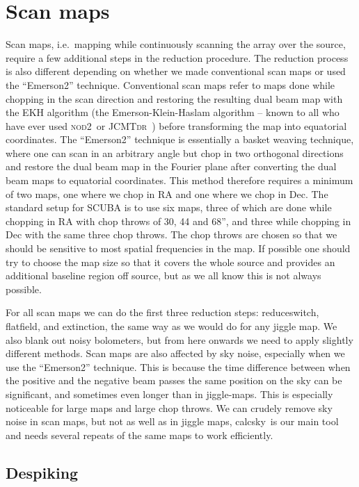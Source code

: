 \documentclass[twoside,11pt]{article}
\newcommand{\jcmtdr}{\xref{\textsc{JCMTdr}}{sun132}{}}
\newcommand{\nod}{\textsc{nod2}}
\newcommand{\task}[1]{\textsf{#1}}
\newcommand{\calcsky}{\xref{\task{calcsky}}{sun216}{CALCSKY}}
\newcommand{\resw}{\xref{\task{reduce\_switch}}{sun216}{REDUCE_SWITCH}}
\newcommand{\flatf}{\xref{\task{flatfield}}{sun216}{FLATFIELD}}
\newcommand{\ext}{\xref{\task{extinction}}{sun216}{EXTINCTION}}
\newcommand{\xref}[3]{#1}
\newcommand{\xlabel}[1]{}
\renewcommand{\_}{\texttt{\symbol{95}}}
\begin{document}
\section{\xlabel{Scanmaps}Scan maps}

Scan maps, i.e.\ mapping while continuously scanning the array over the
source, require a few additional steps in the reduction procedure. The
reduction process is also different depending on whether we made
conventional scan maps or used the ``Emerson2'' technique.
Conventional scan maps refer to maps done while chopping in the scan
direction and restoring the resulting dual beam map with the
EKH algorithm (the Emerson-Klein-Haslam algorithm -- known to all who
have ever used \nod\ or \jcmtdr\ \cite{jcmtdr}) before transforming the
map into equatorial coordinates.  The ``Emerson2'' technique is
essentially a basket weaving technique, where one can scan in an
arbitrary angle but chop in two orthogonal directions and restore the
dual beam map in the Fourier plane after converting the dual beam maps
to equatorial coordinates. This method therefore requires a minimum of
two maps, one where we chop in RA and one where we chop in Dec. The
standard setup for SCUBA is to use six maps, three of which are done
while chopping in RA with chop throws of 30, 44 and 68'', and three
while chopping in Dec with the same three chop throws. The chop throws
are chosen so that we should be sensitive to most spatial frequencies
in the map. If possible one should try to choose the map size so that
it covers the whole source and provides an additional baseline region
off source, but as we all know this is not always possible.

For all scan maps we can do the first three reduction steps: \resw,
\flatf, and \ext, the same way as we would do for any jiggle map.  We
also blank out noisy bolometers, but from here onwards we need to
apply slightly different methods.  Scan maps are also affected by sky
noise, especially when we use the ``Emerson2'' technique.  This is
because the time difference between when the positive and the negative
beam passes the same position on the sky can be significant, and
sometimes even longer than in jiggle-maps.  This is especially
noticeable for large maps and large chop throws.  We can crudely
remove sky noise in scan maps, but not as well as in jiggle maps,
\calcsky\ is our main tool and needs several repeats of the same maps
to work efficiently.


\subsection{\xlabel{despiking_scan_maps}Despiking}
\end{document}

